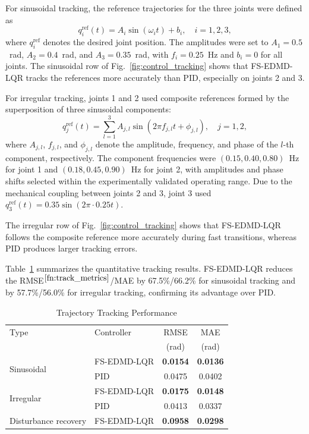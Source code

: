 \documentclass[letterpaper,10pt,conference]{ieeeconf}
\begin{document}
For sinusoidal tracking, the reference trajectories for the three joints
were defined as
\begin{equation}
    q_i^{\text{ref}}(t) = A_i \sin(\omega_i t) + b_i, \quad i = 1, 2, 3,
\end{equation}
where $q_i^{\text{ref}}$ denotes the desired joint position. The amplitudes were set to $A_1=0.5$~rad, $A_2=0.4$~rad, and $A_3=0.35$~rad, with $f_i=0.25$~Hz and $b_i=0$ for all joints. The sinusoidal row of Fig.~\ref{fig:control_tracking} shows that FS-EDMD-LQR tracks the references more accurately than PID, especially on joints 2 and 3.

For irregular tracking, joints 1 and 2 used composite references formed by the superposition of three sinusoidal components:
\begin{equation}
q_j^{\text{ref}}(t) = \sum_{l=1}^{3} A_{j,l} \sin(2\pi f_{j,l} t + \phi_{j,l}),
\quad j = 1, 2,
\end{equation}
where $A_{j,l}$, $f_{j,l}$, and $\phi_{j,l}$ denote the amplitude, frequency, and phase of the $l$-th component, respectively. The component frequencies were $(0.15,0.40,0.80)$~Hz for joint 1 and $(0.18,0.45,0.90)$~Hz for joint 2, with amplitudes and phase shifts selected within the experimentally validated operating range. Due to the mechanical coupling between joints 2 and 3, joint 3 used $q_3^{\text{ref}}(t)=0.35\sin(2\pi\cdot0.25t)$.

The irregular row of Fig.~\ref{fig:control_tracking} shows that FS-EDMD-LQR follows the composite reference more accurately during fast transitions, whereas PID produces larger tracking errors.

Table~\ref{tab:control_metrics} summarizes the quantitative tracking results. FS-EDMD-LQR reduces the RMSE$^{\ref{fn:track_metrics}}$/MAE by 67.5\%/66.2\% for sinusoidal tracking and by 57.7\%/56.0\% for irregular tracking, confirming its advantage over PID.

\begin{table}[htbp]
\centering
\caption{Trajectory Tracking Performance}
\label{tab:control_metrics}
\small
\setlength{\tabcolsep}{4pt}
\begin{tabular}{llcc}
\toprule
Type & Controller & RMSE & MAE \\
 &  & (rad) & (rad) \\
\midrule
\multirow{2}{*}{Sinusoidal}
    & FS-EDMD-LQR & \textbf{0.0154} & \textbf{0.0136} \\
    & PID & 0.0475 & 0.0402 \\
\midrule
\multirow{2}{*}{Irregular}
    & FS-EDMD-LQR & \textbf{0.0175} & \textbf{0.0148} \\
    & PID & 0.0413 & 0.0337 \\
\midrule
Disturbance recovery
    & FS-EDMD-LQR & \textbf{0.0958} & \textbf{0.0298} \\
\bottomrule
\end{tabular}
\end{table}
\end{document}
